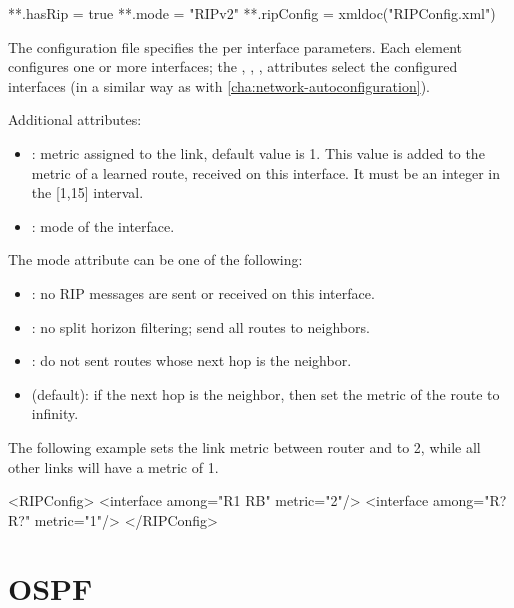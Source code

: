 \begin{inifile}
**.hasRip = true
**.mode = "RIPv2"
**.ripConfig = xmldoc("RIPConfig.xml")
\end{inifile}

The configuration file specifies the per interface parameters.
Each  element configures one or more interfaces;
the , , ,  attributes
select the configured interfaces (in a similar way as with
 \ref{cha:network-autoconfiguration}).

Additional attributes:

\begin{itemize}
  \item {}: metric assigned to the link, default value is 1.
        This value is added to the metric of a learned route,
        received on this interface. It must be an integer in
        the [1,15] interval.
  \item {}: mode of the interface.
\end{itemize}

The mode attribute can be one of the following:

\begin{itemize}
  \item {}: no RIP messages are sent or received on this interface.
  \item {}: no split horizon filtering; send all routes to
        neighbors.
  \item {}: do not sent routes whose next hop is the neighbor.
  \item {} (default): if the next hop is the neighbor, then
  set the metric of the route to infinity.
\end{itemize}

The following example sets the link metric between router
 and  to 2, while all other links will have a metric of 1.

\begin{XML}
<RIPConfig>
  <interface among="R1 RB" metric="2"/>
  <interface among="R? R?" metric="1"/>
</RIPConfig>
\end{XML}

\section{OSPF}
\label{sec:routing:ospf}

